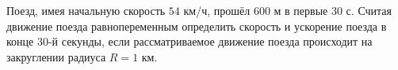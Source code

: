 Поезд, имея начальную скорость $54$ км/ч, прошёл $600$ м в первые
$30$ с. Считая движение поезда равнопеременным определить скорость и
ускорение поезда в конце $30$-й секунды, если рассматриваемое движение
поезда происходит на закруглении радиуса $R=1$ км.
